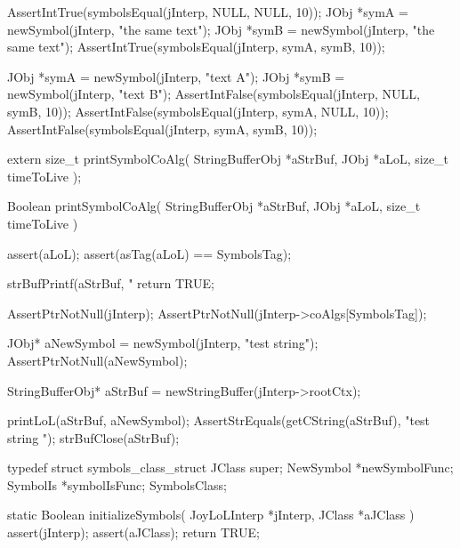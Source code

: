 
\startCTest
  AssertIntTrue(symbolsEqual(jInterp, NULL, NULL, 10));
  JObj *symA = newSymbol(jInterp, "the same text");
  JObj *symB = newSymbol(jInterp, "the same text");
  AssertIntTrue(symbolsEqual(jInterp, symA, symB, 10));
\stopCTest
\stopTestCase


\startCTest
  JObj *symA = newSymbol(jInterp, "text A");
  JObj *symB = newSymbol(jInterp, "text B");
  AssertIntFalse(symbolsEqual(jInterp, NULL, symB, 10));
  AssertIntFalse(symbolsEqual(jInterp, symA, NULL, 10));
  AssertIntFalse(symbolsEqual(jInterp, symA, symB, 10));
\stopCTest
\stopTestCase
\stopTestSuite



\startCHeader
extern size_t printSymbolCoAlg(
  StringBufferObj *aStrBuf,
  JObj            *aLoL,
  size_t           timeToLive
);
\stopCHeader
{}

\startCCode
Boolean printSymbolCoAlg(
  StringBufferObj *aStrBuf,
  JObj            *aLoL,
  size_t           timeToLive
) {
  assert(aLoL);
  assert(asTag(aLoL) == SymbolsTag);

  strBufPrintf(aStrBuf, "%
  return TRUE;
}
\stopCCode


\startCTest
  AssertPtrNotNull(jInterp);
  AssertPtrNotNull(jInterp->coAlgs[SymbolsTag]);

  JObj* aNewSymbol = newSymbol(jInterp, "test string");
  AssertPtrNotNull(aNewSymbol);
  
  StringBufferObj* aStrBuf = newStringBuffer(jInterp->rootCtx);
  
  printLoL(aStrBuf, aNewSymbol);
  AssertStrEquals(getCString(aStrBuf),
    "test string ");
  strBufClose(aStrBuf);
\stopCTest
\stopTestCase
\stopTestSuite

\startTestSuite[registerSymbols]

\startCHeader
typedef struct symbols_class_struct {
  JClass  super;
  NewSymbol  *newSymbolFunc;
  SymbolIs   *symbolIsFunc;
} SymbolsClass;
\stopCHeader

\startCCode
static Boolean initializeSymbols(
  JoyLoLInterp *jInterp,
  JClass   *aJClass
) {
  assert(jInterp);
  assert(aJClass);
  return TRUE;
}
\stopCCode

